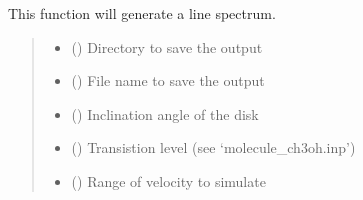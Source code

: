 \documentclass[a4paper,11pt,english]{sphinxmanual}
\begin{document}
\begin{fulllineitems}
\begin{fulllineitems}
\label{\detokenize{radmc3d:simulate.generate_simulation.generate_line_spectrum}}
\pysigstartsignatures
\pysiglinewithargsret
{}
{\sphinxparamcomma {}\sphinxparamcomma {}\sphinxparamcomma {}\sphinxparamcomma {}\sphinxparamcomma {}\sphinxparamcomma {}\sphinxparamcomma {}\sphinxparamcomma {}\sphinxparamcomma {}\sphinxparamcomma {}}
{}
\pysigstopsignatures
\sphinxAtStartPar
This function will generate a line spectrum.
\begin{quote}\begin{description}
\begin{itemize}
\item {} 
\sphinxAtStartPar
{} () \textendash{} Directory to save the output

\item {} 
\sphinxAtStartPar
{} () \textendash{} File name to save the output

\item {} 
\sphinxAtStartPar
{} () \textendash{} Inclination angle of the disk

\item {} 
\sphinxAtStartPar
{} () \textendash{} Transistion level (see ‘molecule\_ch3oh.inp’)

\item {} 
\sphinxAtStartPar
{} () \textendash{} Range of velocity to simulate


\end{itemize}
\end{description}
\end{quote}
\end{fulllineitems}
\end{fulllineitems}
\end{document}
